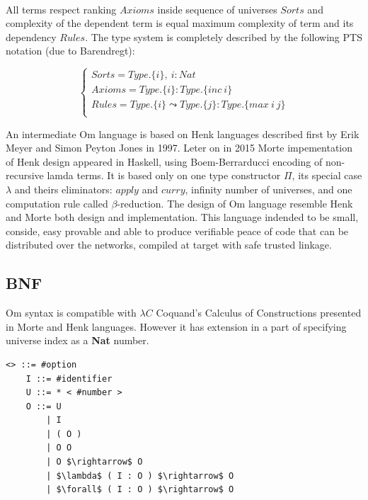 \documentclass[11pt,oneside]{article}
\begin{document}
   \paragraph{}
   All terms respect ranking $Axioms$ inside sequence of universes $Sorts$ and complexity of the
   dependent term is equal maximum complexity of term and its dependency $Rules$. The type
   system is completely described by the following PTS notation (due to Barendregt):

$$
\begin{cases}
    Sorts = Type.\{i\},\ i : Nat\\
    Axioms = Type.\{i\} : Type.\{inc\ i\}\\
    Rules = Type.\{i\} \leadsto Type.\{j\} : Type.\{max\ i\ j\}\\
\end{cases}
$$

   An intermediate Om language is based on Henk\cite{henk} languages described first
   by Erik Meyer and Simon Peyton Jones in 1997. Leter on in 2015 Morte impementation
   of Henk design appeared in Haskell, using Boem-Berrarducci encoding of non-recursive lamda terms.
   It is based only on one type constructor $\Pi$, its special case $\lambda$ and theirs eliminators:
   $apply$ and $curry$, infinity number of universes,
   and one computation rule called $\beta$-reduction.
   The design of Om language resemble Henk and Morte both
   design and implementation. This language indended to be small, conside, easy provable
   and able to produce verifiable peace of code that can be distributed over the networks,
   compiled at target with safe trusted linkage.

   \subsection{BNF}
\vspace{0.5cm}
   Om syntax is compatible with $\lambda C$ Coquand's Calculus of Constructions presented
   in Morte and Henk languages. However it has extension in a part of specifying
   universe index as a {\bf Nat} number.

\vspace{0.5cm}
\begin{lstlisting}[mathescape=true]
   <> ::= #option
    I ::= #identifier
    U ::= * < #number >
    O ::= U
        | I
        | ( O )
        | O O
        | O $\rightarrow$ O
        | $\lambda$ ( I : O ) $\rightarrow$ O
        | $\forall$ ( I : O ) $\rightarrow$ O
\end{lstlisting}
\end{document}

